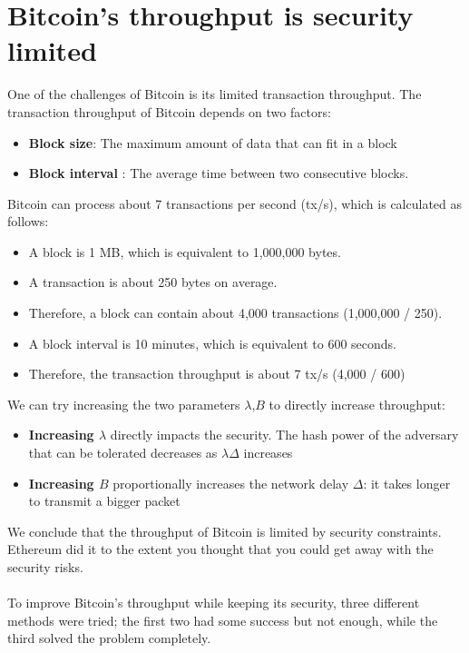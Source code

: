 \section{Bitcoin’s throughput is security limited}
One of the challenges of Bitcoin is its limited transaction throughput. The transaction throughput of Bitcoin depends on two factors:
\begin{itemize}
    \item \textbf{Block size}:  The maximum amount of data that can fit in a block
    \item \textbf{Block interval} : The average time between two consecutive blocks.
\end{itemize} 
Bitcoin can process about 7 transactions per second (tx/s), which is calculated as follows:
\begin{itemize}
    \item A block is 1 MB, which is equivalent to 1,000,000 bytes.
    \item A transaction is about 250 bytes on average.
    \item Therefore, a block can contain about 4,000 transactions (1,000,000 / 250).
    \item A block interval is 10 minutes, which is equivalent to 600 seconds.
    \item Therefore, the transaction throughput is about 7 tx/s (4,000 / 600)
\end{itemize}
We can try increasing the two parameters $\lambda$,$B$ to directly increase throughput:
\begin{itemize}
    \item \textbf{Increasing $\lambda$} directly impacts the security. The hash power of the adversary that can be tolerated
    decreases as $\lambda\Delta$ increases
    \item \textbf{Increasing $B$} proportionally increases the network delay $\Delta$: it takes longer to transmit
    a bigger packet
\end{itemize}
We conclude that the throughput of Bitcoin is limited by security constraints.
Ethereum did it to the extent you thought that you could get away with the security risks.\\\\
To improve Bitcoin’s throughput while keeping its security, three different methods were tried; the first two had some success but not enough, while the third solved the problem completely.

